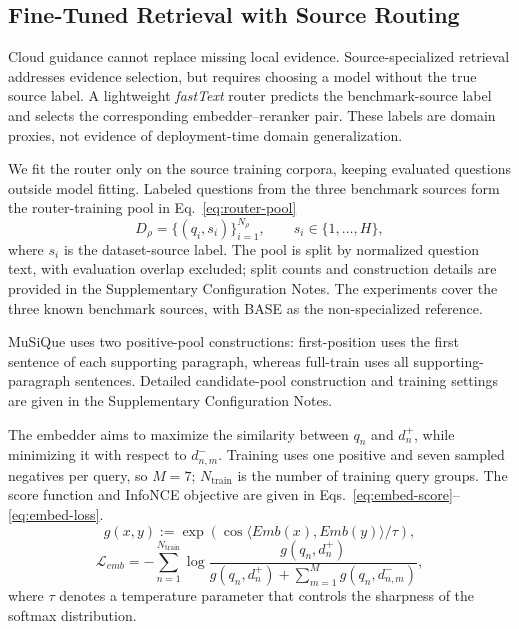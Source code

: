 \documentclass[a4paper,fleqn]{cas-dc}
\begin{document}
\subsection{Fine-Tuned Retrieval with Source Routing}
Cloud guidance cannot replace missing local evidence. Source-specialized retrieval addresses evidence selection, but requires choosing a model without the true source label. A lightweight \textit{fastText} router \cite{joulin2017bag} predicts the benchmark-source label and selects the corresponding embedder--reranker pair. These labels are domain proxies, not evidence of deployment-time domain generalization.

We fit the router only on the source training corpora, keeping evaluated questions outside model fitting. Labeled questions from the three benchmark sources form the router-training pool in Eq.~\eqref{eq:router-pool}
\begin{equation}\label{eq:router-pool}
D_{\rho}=\{(q_i,s_i)\}_{i=1}^{N_{\rho}},\qquad s_i\in\{1,\ldots,H\},
\end{equation}
where \(s_i\) is the dataset-source label. The pool is split by normalized question text, with evaluation overlap excluded; split counts and construction details are provided in the Supplementary Configuration Notes. The experiments cover the three known benchmark sources, with BASE as the non-specialized reference.

MuSiQue uses two positive-pool constructions: first-position uses the first sentence of each supporting paragraph, whereas full-train uses all supporting-paragraph sentences. Detailed candidate-pool construction and training settings are given in the Supplementary Configuration Notes.

The embedder aims to maximize the similarity between \(q_n\) and \(d_n^+\), while minimizing it with respect to \(d_{n,m}^-\). Training uses one positive and seven sampled negatives per query, so \(M=7\); \(N_{\mathrm{train}}\) is the number of training query groups. The score function and InfoNCE objective are given in Eqs.~\eqref{eq:embed-score}--\eqref{eq:embed-loss}.
\begin{equation}\label{eq:embed-score}
g(x,y):=\exp\left(\cos\langle Emb(x),Emb(y)\rangle/\tau\right),
\end{equation}
\begin{equation}\label{eq:embed-loss}
\mathcal{L}_{emb} = -\sum_{n=1}^{N_{\mathrm{train}}} \log \frac{g(q_n, d_n^+)}{g(q_n, d_n^+) + \sum_{m=1}^{M} g(q_n, d_{n,m}^-)},
\end{equation}
where \(\tau\) denotes a temperature parameter that controls the sharpness of the softmax distribution.
\end{document}
